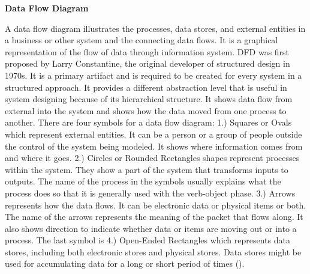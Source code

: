 \flushleft
\textbf{Data Flow Diagram}\\
\justifying

\parx
A data flow diagram illustrates the processes, data stores, and external entities in
a business or other system and the connecting data flows. It is a graphical
representation of the flow of data through information system. DFD was first
proposed by Larry Constantine, the original developer of structured design in 1970s. It
is a primary artifact and is required to be created for every system in a structured
approach. It provides a different abstraction level that is useful in system designing
because of its hierarchical structure.  It shows data flow from external into the system
and shows how the data moved from one process to another. There are four symbols for
a data flow diagram: 1.) Squares or Ovals which represent external entities. It can be
a person or a group of people outside the control of the system being modeled. It shows
where information comes from and where it goes. 2.) Circles or Rounded Rectangles shapes
represent processes within the system. They show a part of the system that transforms
inputs to outputs. The name of the process  in the symbols usually explains what the
process does so that it is generally used with the verb-object phase. 3.) Arrows represents
how the data flows. It can be electronic data or physical items or both. The name of
the arrows represents the meaning of the packet that flows along. It also shows direction
to indicate whether data or items are moving out or into a process. The last symbol is
4.) Open-Ended Rectangles which represents data stores, including both electronic stores
and physical stores. Data stores might be used for accumulating data for a long or short
period of times (\cite{arwa_2016}).
